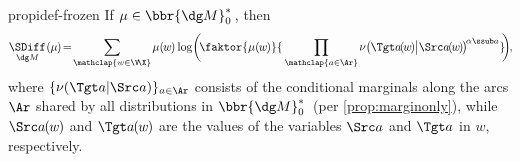 \begin{linked}{prop}{idef-frozen}
If $\mu \in \bbr{\dg M}_0^*$\,,
then
\vspace{-0.4ex}
\begin{equation}
    \underset{{\dg M}}{\SDiff_{}}(\mskip-0.5mu\mu\mskip-1mu) \!=\!
        \sum_{\mathclap{ w \in \V\!\X } }
            \mskip-1mu
            \mu(\mskip-1.5mu w \mskip-1.5mu)
            \log \!  \bigg(\!
                \faktor{\mu(\mskip-1.5mu w\mskip-1.5mu )}{\,\prod_{\mathclap{a \in \Ar}} 
                \mskip-1mu
                \nu\big(\mskip-1mu\Tgt a \mskip-2.2mu(\mskip-2mu w \mskip-2mu) 
                    \mskip-0.5mu \big|  \Src a \mskip-2mu(\mskip-2mu w \mskip-2mu)\mskip-2mu\big)^
                {\!\alpha\ssub a}
                }\!\mskip-2mu
            \bigg)\mskip-2mu
        ,\!
        \label{eq:idef-alt-constr}
\end{equation}
%
where $\{ \nu(\Tgt a | \Src a ) \}_{a \in \Ar}$ consists of the
conditional marginals along the arcs $\Ar$
shared by all distributions in $\bbr{\dg M}^*_0$\
(per \cref{prop:marginonly}),
while $\Src a \mskip-1mu(\mskip-1mu w \mskip-1mu)$ and $\Tgt a \mskip-1mu(\mskip-1mu w \mskip-1mu)$ are the
values of the variables $\Src a$ and $\Tgt a$
in $w$,
respectively.
\end{linked}

